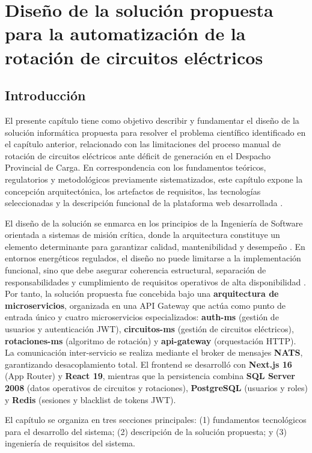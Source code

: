 \chapter{Diseño de la solución propuesta para la automatización de la rotación de circuitos eléctricos}

\section{Introducción}

El presente capítulo tiene como objetivo describir y fundamentar el diseño de la solución informática propuesta para resolver el problema científico identificado en el capítulo anterior, relacionado con las limitaciones del proceso manual de rotación de circuitos eléctricos ante déficit de generación en el Despacho Provincial de Carga. En correspondencia con los fundamentos teóricos, regulatorios y metodológicos previamente sistematizados, este capítulo expone la concepción arquitectónica, los artefactos de requisitos, las tecnologías seleccionadas y la descripción funcional de la plataforma web desarrollada \cite{pressman2020}.

El diseño de la solución se enmarca en los principios de la Ingeniería de Software orientada a sistemas de misión crítica, donde la arquitectura constituye un elemento determinante para garantizar calidad, mantenibilidad y desempeño \cite{bass2013}. En entornos energéticos regulados, el diseño no puede limitarse a la implementación funcional, sino que debe asegurar coherencia estructural, separación de responsabilidades y cumplimiento de requisitos operativos de alta disponibilidad \cite{gomez2016}. Por tanto, la solución propuesta fue concebida bajo una \textbf{arquitectura de microservicios}, organizada en una API Gateway que actúa como punto de entrada único y cuatro microservicios especializados: \textbf{auth-ms} (gestión de usuarios y autenticación JWT), \textbf{circuitos-ms} (gestión de circuitos eléctricos), \textbf{rotaciones-ms} (algoritmo de rotación) y \textbf{api-gateway} (orquestación HTTP). La comunicación inter-servicio se realiza mediante el broker de mensajes \textbf{NATS}, garantizando desacoplamiento total. El frontend se desarrolló con \textbf{Next.js 16} (App Router) y \textbf{React 19}, mientras que la persistencia combina \textbf{SQL Server 2008} (datos operativos de circuitos y rotaciones), \textbf{PostgreSQL} (usuarios y roles) y \textbf{Redis} (sesiones y blacklist de tokens JWT).

El capítulo se organiza en tres secciones principales: (1) fundamentos tecnológicos para el desarrollo del sistema; (2) descripción de la solución propuesta; y (3) ingeniería de requisitos del sistema.

